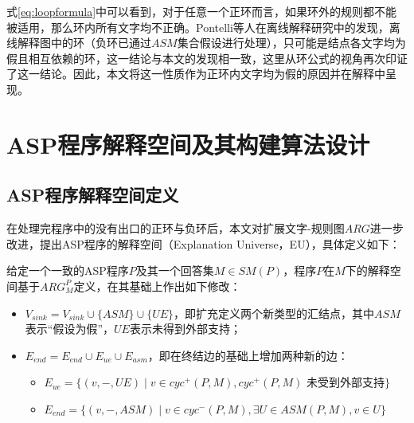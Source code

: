 式\eqref{eq:loopformula}中可以看到，对于任意一个正环而言，如果环外的规则都不能被适用，那么环内所有文字均不正确。Pontelli等人在离线解释研究中的发现，离线解释图中的环（负环已通过$ASM$集合假设进行处理），只可能是结点各文字均为假且相互依赖的环\cite{pontelli2009justifications}，这一结论与本文的发现相一致，这里从环公式的视角再次印证了这一结论。因此，本文将这一性质作为正环内文字均为假的原因并在解释中呈现。

\section{ASP程序解释空间及其构建算法设计}
\subsection{ASP程序解释空间定义}
在处理完程序中的没有出口的正环与负环后，本文对扩展文字-规则图$ARG$进一步改进，提出ASP程序的解释空间（Explanation Universe，EU），具体定义如下：
\begin{definition}[ASP程序解释空间]
    给定一个一致的ASP程序$P$及其一个回答集$M \in SM(P)$，程序$P$在$M$下的解释空间基于$ARG^P_M$定义，在其基础上作出如下修改：
    \begin{itemize}[topsep=0pt]
        \setlength\itemsep{-0.3em}
        \item $V_{sink} = V_{sink} \cup \{ASM\} \cup \{UE\}$，即扩充定义两个新类型的汇结点，其中$ASM$表示“假设为假”，$UE$表示未得到外部支持；
        \item $E_{end} = E_{end} \cup E_{ue} \cup E_{asm}$，即在终结边的基础上增加两种新的边：
        \begin{itemize}[topsep=0pt,label=$\circ$]
            \setlength\itemsep{-0.3em}
            \item $E_{ue} = \{(v, -, UE) \mid v \in cyc^+(P, M), cyc^+(P, M)\text{ 未受到外部支持}\}$
            \item $E_{end} = \{(v, -, ASM) \mid v \in cyc^-(P, M), \exists U \in ASM(P, M), v \in U\}$
        \end{itemize}
    \end{itemize}
\end{definition}

